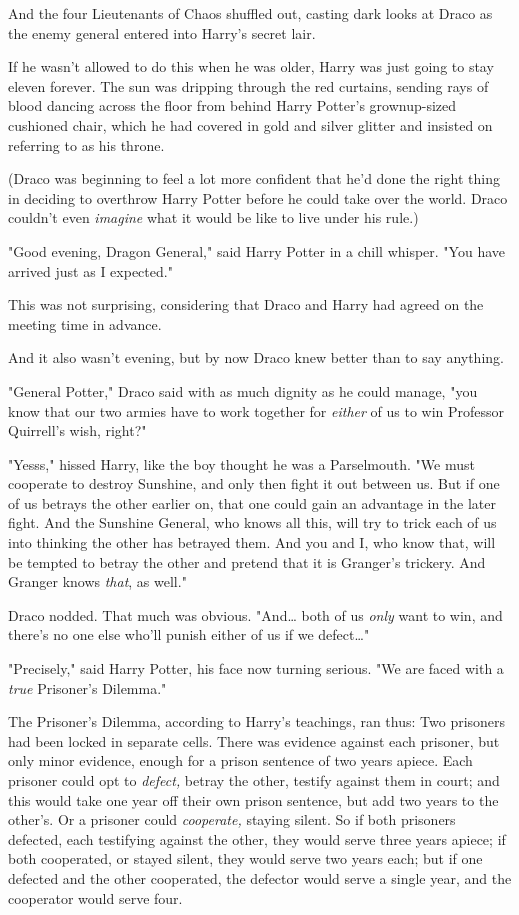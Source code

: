 And the four Lieutenants of Chaos shuffled out, casting dark looks at Draco as
the enemy general entered into Harry's secret lair.

If he wasn't allowed to do this when he was older, Harry was just going to stay
eleven forever.
\later
The sun was dripping through the red curtains, sending rays of blood dancing
across the floor from behind Harry Potter's grownup-sized cushioned chair,
which he had covered in gold and silver glitter and insisted on referring to as
his throne.

(Draco was beginning to feel a lot more confident that he'd done the right
thing in deciding to overthrow Harry Potter before he could take over the
world. Draco couldn't even \emph{imagine} what it would be like to live under
his rule.)

"Good evening, Dragon General," said Harry Potter in a chill whisper. "You have
arrived just as I expected."

This was not surprising, considering that Draco and Harry had agreed on the
meeting time in advance.

And it also wasn't evening, but by now Draco knew better than to say anything.

"General Potter," Draco said with as much dignity as he could manage, "you know
that our two armies have to work together for \emph{either} of us to win
Professor Quirrell's wish, right?"

"Yesss," hissed Harry, like the boy thought he was a Parselmouth. "We must
cooperate to destroy Sunshine, and only then fight it out between us. But if
one of us betrays the other earlier on, that one could gain an advantage in the
later fight. And the Sunshine General, who knows all this, will try to trick
each of us into thinking the other has betrayed them. And you and I, who know
that, will be tempted to betray the other and pretend that it is Granger's
trickery. And Granger knows \emph{that}, as well."

Draco nodded. That much was obvious. "And{\ldots} both of us \emph{only} want
to win, and there's no one else who'll punish either of us if we defect{\ldots}"

"Precisely," said Harry Potter, his face now turning serious. "We are faced
with a \emph{true} Prisoner's Dilemma."

The Prisoner's Dilemma, according to Harry's teachings, ran thus: Two prisoners
had been locked in separate cells. There was evidence against each prisoner,
but only minor evidence, enough for a prison sentence of two years apiece. Each
prisoner could opt to \emph{defect,} betray the other, testify against them in
court; and this would take one year off their own prison sentence, but add two
years to the other's. Or a prisoner could \emph{cooperate,} staying silent. So
if both prisoners defected, each testifying against the other, they would serve
three years apiece; if both cooperated, or stayed silent, they would serve two
years each; but if one defected and the other cooperated, the defector would
serve a single year, and the cooperator would serve four.

